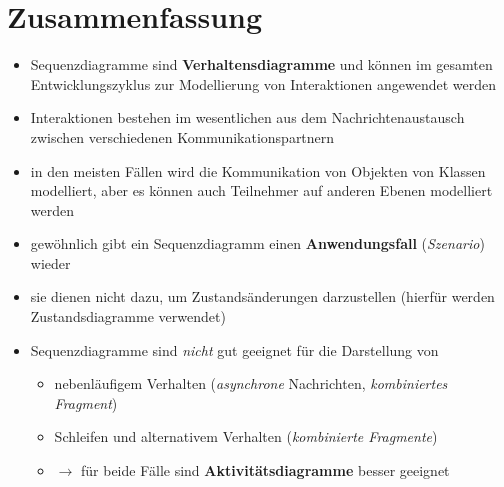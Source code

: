 \section{Zusammenfassung}


\begin{itemize}
    \item Sequenzdiagramme sind \textbf{Verhaltensdiagramme}
    und können im gesamten Entwicklungszyklus zur Modellierung von Interaktionen angewendet werden
    \item Interaktionen bestehen im wesentlichen aus dem Nachrichtenaustausch zwischen verschiedenen Kommunikationspartnern
    \item in den meisten Fällen wird die Kommunikation von Objekten von Klassen modelliert, aber es können auch Teilnehmer auf anderen Ebenen modelliert werden
    \item gewöhnlich gibt ein Sequenzdiagramm einen \textbf{Anwendungsfall} (\textit{Szenario}) wieder
    \item sie dienen nicht dazu, um Zustandsänderungen darzustellen (hierfür werden Zustandsdiagramme verwendet)
    \item Sequenzdiagramme sind \textit{nicht} gut geeignet für die Darstellung von
    \begin{itemize}
        \item nebenläufigem Verhalten (\textit{asynchrone} Nachrichten, \textit{kombiniertes Fragment})
        \item Schleifen und alternativem Verhalten (\textit{kombinierte Fragmente})
        \item[] $\rightarrow$  für beide Fälle sind \textbf{Aktivitätsdiagramme} besser geeignet
    \end{itemize}
\end{itemize}